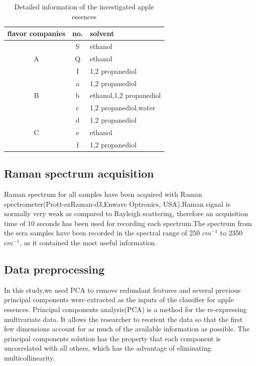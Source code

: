 \documentclass[a4paper]{article}
\begin{document}
\begin{table}[h] %
  \centering
  \caption{Detailed information of the investigated apple essences}\label{a}
  \begin{tabular}{c|c|l}

     \hline
     flavor companies       & no.       & solvent \\
     \hline
     \multirow{3}{*}{A}       & S         & ethanol \\
     \cline{2-3}
                              & Q         & ethanol \\
     \cline{2-3}
                              & I         & 1,2 propanediol \\
     \hline
     \multirow{3}{*}{B}       & a         & 1,2 propanediol \\
     \cline{2-3}
                              & b         & ethanol,1,2 propanediol \\
     \cline{2-3}
                              & c         & 1,2 propanediol,water \\
     \hline
     \multirow{3}{*}{C}       & d         & 1,2 propanediol \\
     \cline{2-3}
                              & e         & ethanol \\
     \cline{2-3}
                              & f         & 1,2 propanediol \\
     \hline
   \end{tabular}

\end{table}



\subsection{Raman spectrum acquisition}%
Raman spectrum for all samples have been acquired with Raman spectrometer(Prott-ezRaman-d3,Enwave Optronics, USA).Raman  signal  is  normally  very  weak  as  compared  to  Rayleigh  scattering,  therefore  an acquisition time of 10 seconds has been used for recording each spectrum.The spectrum from the  sera  samples  have  been  recorded  in  the  spectral  range  of  250 $cm^{−1}$  to  2350 $cm^{−1}$,  as  it contained the most useful information.

\subsection{Data preprocessing}%
In this study,we used PCA to remove redundant features and several previous principal components were extracted as the inputs of the classifier for apple essences.
Principal components analysis(PCA)  is  a  method  for  the  re-expressing  multivariate  data.   It  allows  the researcher to reorient the data so that the first few dimensions account for as much  of  the  available  information  as  possible.  The  principal  components solution has the property that each component is uncorrelated with all others, which  has  the  advantage  of  eliminating  multicollinearity.
\end{document}
